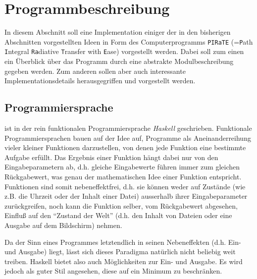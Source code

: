 	\chapter{Programmbeschreibung}\label{cha:program_description}
	In diesem Abschnitt soll eine Implementation einiger der in den bisherigen Abschnitten vorgestellten Ideen in Form des Computerprogramms \texttt{PIRaTE} (=\texttt{P}ath \texttt{I}ntegral \texttt{Ra}diative \texttt{T}ransfer with \texttt{E}ase) vorgestellt werden. Dabei soll zum einen ein Überblick über das Programm durch eine abstrakte Modulbeschreibung gegeben werden. Zum anderen sollen aber auch interessante Implementationsdetails herausgegriffen und vorgestellt werden.
	
	
	\section{Programmiersprache}
	\pirate ist in der rein funktionalen Programmiersprache {\em Haskell} geschrieben. Funktionale Programmiersprachen bauen auf der Idee auf, Programme als Aneinanderreihung vieler kleiner Funktionen darzustellen, von denen jede Funktion eine bestimmte Aufgabe erfüllt. Das Ergebnis einer Funktion hängt dabei nur von den Eingabeparametern ab, d.h. gleiche Eingabewerte führen immer zum gleichen Rückgabewert, was genau der mathematischen Idee einer Funktion entspricht. Funktionen sind somit nebeneffektfrei, d.h. sie können weder auf Zustände (wie z.B. die Uhrzeit oder der Inhalt einer Datei) ausserhalb ihrer Eingabeparameter zurückgreifen, noch kann die Funktion selber, vom Rückgabewert abgesehen, Einfluß auf den ``Zustand der Welt'' (d.h. den Inhalt von Dateien oder eine Ausgabe auf dem Bildschirm) nehmen.
	
	Da der Sinn eines Programmes letztendlich in seinen Nebeneffekten (d.h. Ein- und Ausgabe) liegt, lässt sich dieses Paradigma natürlich nicht beliebig weit treiben. Haskell bietet also auch Möglichkeiten zur Ein- und Ausgabe. Es wird jedoch als guter Stil angesehen, diese auf ein Minimum zu beschränken.
	
